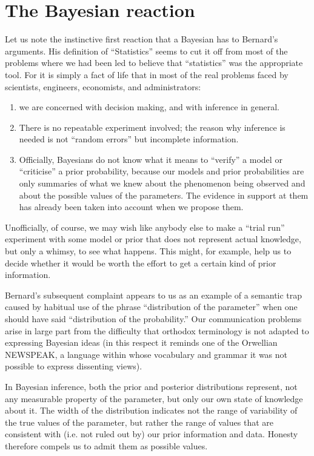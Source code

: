 \documentclass[12pt]{article}
\begin{document}
\section{The Bayesian reaction}

Let us note the instinctive first reaction that a Bayesian
has to Bernard's arguments. His definition of ``Statistics''
seems to cut it off from most of the problems where we had been
led to believe that ``statistics'' was the appropriate tool. For
it is simply a fact of life that in most of the real problems
faced by scientists, engineers, economists, and administrators:
\begin{enumerate}[label=(\Alph*)]
\item we are concerned with decision making, and with
inference in general.

\item There is no repeatable experiment involved; the reason
why inference is needed is not ``random errors'' but
incomplete information.

\item Officially, Bayesians do not know what it means to
``verify'' a model or ``criticise'' a prior probability,
because our models and prior probabilities are only
summaries of what we knew about the phenomenon being observed and about the possible values of the parameters.
The evidence in support at them has already been taken into
account when we propose them.
\end{enumerate}
Unofficially, of course, we may wish like anybody else to make
a ``trial run''  experiment with some model or prior that does not represent actual knowledge, but only a whimsy, to see what
happens. This might, for example, help us to decide whether it
would be worth the effort to get a certain kind of prior information.

Bernard's subsequent complaint appears to us as an example of a semantic trap caused by habitual use of the phrase ``distribution of the parameter'' when one should have said
``distribution of the probability.'' Our communication problems arise in large part from the difficulty that orthodox terminology is not adapted to expressing Bayesian ideas (in
this respect it reminds one of the Orwellian NEWSPEAK, a
language within whose vocabulary and grammar it was not possible to express dissenting views).

In Bayesian inference, both the prior and posterior
distributions represent, not any measurable property of the parameter, but only our own state of knowledge about it. The
width of the distribution indicates not the range of variability of the true values of the parameter, but rather the
range of values that are consistent with (i.e. not ruled out
by) our prior information and data. Honesty therefore compels us to admit them as possible values.
\end{document}

